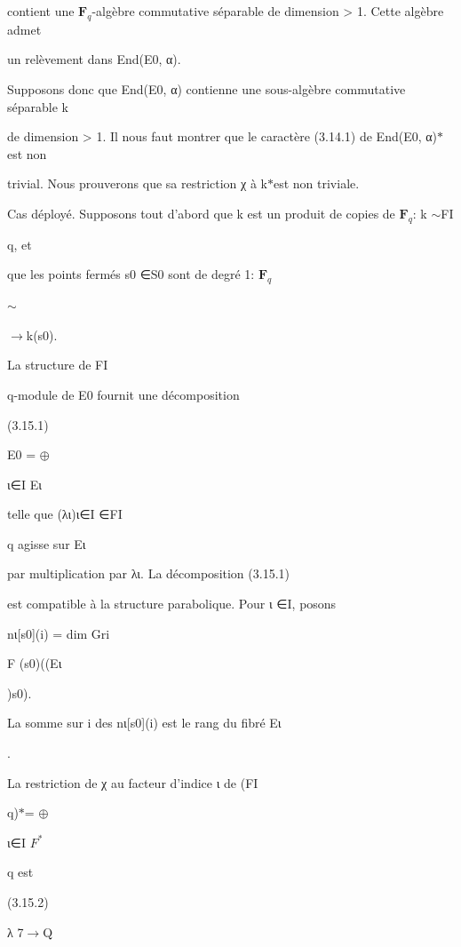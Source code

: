 \documentclass[11pt]{article}
\begin{document}
\noindent contient une \(\mathbf F_q\)-algèbre commutative séparable de dimension > 1. Cette algèbre admet\par
\noindent un relèvement dans End(E0, α).\par
\noindent Supposons donc que End(E0, α) contienne une sous-algèbre commutative séparable k\par
\noindent de dimension > 1. Il nous faut montrer que le caractère (3.14.1) de End(E0, α)\(*\)est non\par
\noindent trivial. Nous prouverons que sa restriction χ à k\(*\)est non triviale.\par
\noindent Cas déployé. Supposons tout d’abord que k est un produit de copies de \(\mathbf F_q\): k \(\sim\)FI\par
\noindent q, et\par
\noindent que les points fermés s0 ∈S0 sont de degré 1: \(\mathbf F_q\)\par
\noindent \(\sim\)\par
\noindent \(\to\)k(s0).\par
\noindent La structure de FI\par
\noindent q-module de E0 fournit une décomposition\par
\noindent (3.15.1)\par
\noindent E0 = \(\oplus\)\par
\noindent ι∈I Eι\par
\medskip
\noindent telle que (λι)ι∈I ∈FI\par
\noindent q agisse sur Eι\par
{} par multiplication par λι. La décomposition (3.15.1)\par
\noindent est compatible à la structure parabolique. Pour ι ∈I, posons\par
\noindent nι[s0](i) = dim Gri\par
\noindent F (s0)((Eι\par
{})s0).\par
\noindent La somme sur i des nι[s0](i) est le rang du fibré Eι\par
{}.\par
\noindent La restriction de χ au facteur d’indice ι de (FI\par
\noindent q)\(*\)= \(\oplus\)\par
\noindent ι∈I \(F^*\)\par
\noindent q est\par
\noindent (3.15.2)\par
\noindent λ 7\(\to\)Q\par
\end{document}
